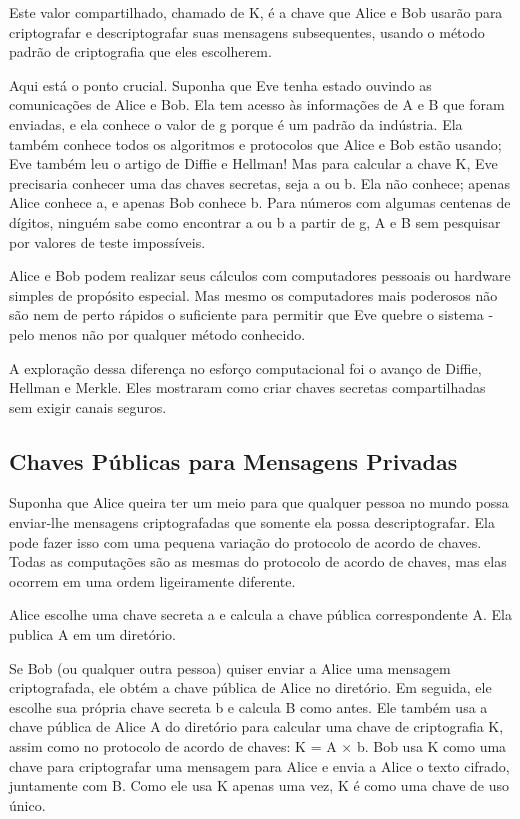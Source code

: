 \documentclass{book}
\begin{document}
Este valor compartilhado, chamado de K, é a chave que Alice e Bob usarão para criptografar e descriptografar suas mensagens subsequentes, usando o método padrão de criptografia que eles escolherem.

Aqui está o ponto crucial. Suponha que Eve tenha estado ouvindo as comunicações de Alice e Bob. Ela tem acesso às informações de A e B que foram enviadas, e ela conhece o valor de g porque é um padrão da indústria. Ela também conhece todos os algoritmos e protocolos que Alice e Bob estão usando; Eve também leu o artigo de Diffie e Hellman! Mas para calcular a chave K, Eve precisaria conhecer uma das chaves secretas, seja a ou b. Ela não conhece; apenas Alice conhece a, e apenas Bob conhece b. Para números com algumas centenas de dígitos, ninguém sabe como encontrar a ou b a partir de g, A e B sem pesquisar por valores de teste impossíveis.

Alice e Bob podem realizar seus cálculos com computadores pessoais ou hardware simples de propósito especial. Mas mesmo os computadores mais poderosos não são nem de perto rápidos o suficiente para permitir que Eve quebre o sistema - pelo menos não por qualquer método conhecido.

A exploração dessa diferença no esforço computacional foi o avanço de Diffie, Hellman e Merkle. Eles mostraram como criar chaves secretas compartilhadas sem exigir canais seguros.


\subsection{Chaves Públicas para Mensagens Privadas}
\label{}

Suponha que Alice queira ter um meio para que qualquer pessoa no mundo possa enviar-lhe mensagens criptografadas que somente ela possa descriptografar. Ela pode fazer isso com uma pequena variação do protocolo de acordo de chaves. Todas as computações são as mesmas do protocolo de acordo de chaves, mas elas ocorrem em uma ordem ligeiramente diferente.

Alice escolhe uma chave secreta a e calcula a chave pública correspondente A. Ela publica A em um diretório.

Se Bob (ou qualquer outra pessoa) quiser enviar a Alice uma mensagem criptografada, ele obtém a chave pública de Alice no diretório. Em seguida, ele escolhe sua própria chave secreta b e calcula B como antes. Ele também usa a chave pública de Alice A do diretório para calcular uma chave de criptografia K, assim como no protocolo de acordo de chaves: K = A × b. Bob usa K como uma chave para criptografar uma mensagem para Alice e envia a Alice o texto cifrado, juntamente com B. Como ele usa K apenas uma vez, K é como uma chave de uso único.
\end{document}
